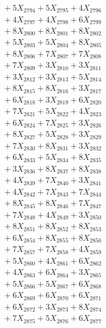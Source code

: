\documentclass[a4paper,10pt]{article}
\begin{document}
{\begin{align}
&\;  + 5 X_{2794} + 5 X_{2795} + 4 X_{2796} \\[0.3ex]
&\;  + 4 X_{2797} + 4 X_{2798} + 6 X_{2799} \\[0.5ex]\allowbreak
&\;  + 8 X_{2800} + 8 X_{2801} + 8 X_{2802} \\[0.3ex]
&\;  + 5 X_{2803} + 5 X_{2804} + 8 X_{2805} \\[0.3ex]
&\;  + 8 X_{2806} + 7 X_{2807} + 7 X_{2808} \\[0.3ex]
&\;  + 7 X_{2809} + 3 X_{2810} + 3 X_{2811} \\[0.3ex]
&\;  + 3 X_{2812} + 3 X_{2813} + 5 X_{2814} \\[0.3ex]
&\;  + 8 X_{2815} + 8 X_{2816} + 3 X_{2817} \\[0.3ex]
&\;  + 6 X_{2818} + 3 X_{2819} + 6 X_{2820} \\[0.3ex]
&\;  + 7 X_{2821} + 5 X_{2822} + 4 X_{2823} \\[0.3ex]
&\;  + 6 X_{2824} + 7 X_{2825} + 3 X_{2826} \\[0.3ex]
&\;  + 8 X_{2827} + 5 X_{2828} + 3 X_{2829} \\[0.5ex]\allowbreak
&\;  + 7 X_{2830} + 8 X_{2831} + 3 X_{2832} \\[0.3ex]
&\;  + 6 X_{2833} + 5 X_{2834} + 8 X_{2835} \\[0.3ex]
&\;  + 3 X_{2836} + 8 X_{2837} + 8 X_{2838} \\[0.3ex]
&\;  + 4 X_{2839} + 7 X_{2840} + 3 X_{2841} \\[0.3ex]
&\;  + 4 X_{2842} + 7 X_{2843} + 7 X_{2844} \\[0.3ex]
&\;  + 8 X_{2845} + 8 X_{2846} + 7 X_{2847} \\[0.3ex]
&\;  + 7 X_{2848} + 4 X_{2849} + 3 X_{2850} \\[0.3ex]
&\;  + 8 X_{2851} + 8 X_{2852} + 8 X_{2853} \\[0.3ex]
&\;  + 6 X_{2854} + 8 X_{2855} + 8 X_{2856} \\[0.3ex]
&\;  + 7 X_{2857} + 7 X_{2858} + 4 X_{2859} \\[0.5ex]\allowbreak
&\;  + 5 X_{2860} + 4 X_{2861} + 6 X_{2862} \\[0.3ex]
&\;  + 4 X_{2863} + 6 X_{2864} + 3 X_{2865} \\[0.3ex]
&\;  + 5 X_{2866} + 5 X_{2867} + 6 X_{2868} \\[0.3ex]
&\;  + 6 X_{2869} + 6 X_{2870} + 6 X_{2871} \\[0.3ex]
&\;  + 6 X_{2872} + 3 X_{2873} + 8 X_{2874} \\[0.3ex]
&\;  + 7 X_{2875} + 5 X_{2876} + 6 X_{2877} \\[0.3ex]

\end{align}}
\end{document}
